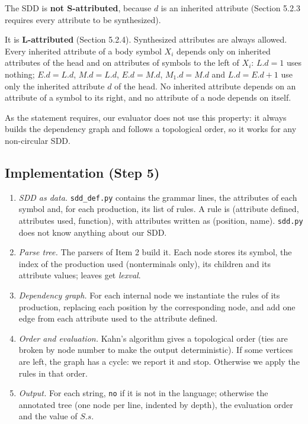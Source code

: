 \documentclass[11pt]{article}
\begin{document}
The SDD is \textbf{not S-attributed}, because $d$ is an inherited attribute
(Section 5.2.3 requires every attribute to be synthesized).

It is \textbf{L-attributed} (Section 5.2.4). Synthesized attributes are always
allowed. Every inherited attribute of a body symbol $X_i$ depends only on
inherited attributes of the head and on attributes of symbols to the left of
$X_i$: $L.d = 1$ uses nothing; $E.d = L.d$, $M.d = L.d$, $E.d = M.d$,
$M_1.d = M.d$ and $L.d = E.d + 1$ use only the inherited attribute $d$ of the
head. No inherited attribute depends on an attribute of a symbol to its right,
and no attribute of a node depends on itself.

As the statement requires, our evaluator does not use this property: it
always builds the dependency graph and follows a topological order, so it
works for any non-circular SDD.

\subsection{Implementation (Step 5)}

\begin{enumerate}
\item \emph{SDD as data.} \texttt{sdd\_def.py} contains the grammar lines, the
attributes of each symbol and, for each production, its list of rules. A rule
is (attribute defined, attributes used, function), with attributes written as
(position, name). \texttt{sdd.py} does not know anything about our SDD.
\item \emph{Parse tree.} The parsers of Item 2 build it. Each node stores its
symbol, the index of the production used (nonterminals only), its children
and its attribute values; leaves get \textit{lexval}.
\item \emph{Dependency graph.} For each internal node we instantiate the rules
of its production, replacing each position by the corresponding node, and
add one edge from each attribute used to the attribute defined.
\item \emph{Order and evaluation.} Kahn's algorithm gives a topological order
(ties are broken by node number to make the output deterministic). If some
vertices are left, the graph has a cycle: we report it and stop. Otherwise we
apply the rules in that order.
\item \emph{Output.} For each string, \texttt{no} if it is not in the
language; otherwise the annotated tree (one node per line, indented by depth),
the evaluation order and the value of $S.s$.
\end{enumerate}
\end{document}
